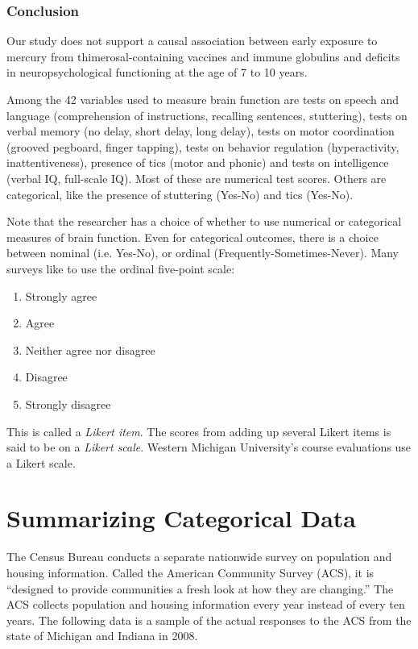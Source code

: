 \documentclass[11pt, chapterprefix=true]{scrbook}\usepackage[]{graphicx}\usepackage[]{color}
\begin{document}
\subsubsection{Conclusion}

Our study does not support a causal association between early exposure to mercury from thimerosal-containing vaccines and immune globulins and deficits in neuropsychological functioning at the age of 7 to 10 years.

Among the 42 variables used to measure brain function are tests on speech and language (comprehension of instructions, recalling sentences, stuttering), tests on verbal memory (no delay, short delay, long delay), tests on motor coordination (grooved pegboard, finger tapping), tests on behavior regulation (hyperactivity, inattentiveness), presence of tics (motor and phonic) and tests on intelligence (verbal IQ, full-scale IQ).  Most of these are numerical test scores.  Others are categorical, like the presence of stuttering (Yes-No) and tics (Yes-No).

Note that the researcher has a choice of whether to use numerical or categorical measures of brain function.  Even for categorical outcomes, there is a choice between nominal (i.e. Yes-No), or ordinal (Frequently-Sometimes-Never). Many surveys like to use the ordinal five-point scale:

\begin{enumerate}
\item Strongly agree
\item Agree
\item Neither agree nor disagree
\item Disagree
\item Strongly disagree
\end{enumerate}

This is called a \textit{Likert item}.  The scores from adding up several Likert items is said to be on a \textit{Likert scale}.  Western Michigan University's course evaluations use a Likert scale.

\section{Summarizing Categorical Data}

The Census Bureau conducts a separate nationwide survey on population and housing information.  Called the American Community Survey (ACS), it is ``designed to provide communities a fresh look at how they are changing.'' The ACS collects population and housing information every year instead of every ten years.  The following data is a sample of the actual responses to the ACS from the state of Michigan and Indiana in 2008.
\end{document}
